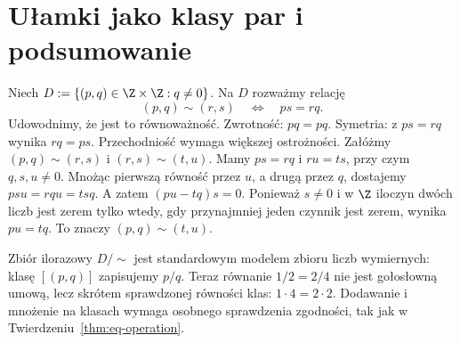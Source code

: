\section{Ułamki jako klasy par i podsumowanie}\label{sec:eq-fractions}
\begin{przyklad}
Niech $D:=\{(p,q)\in\Z\times\Z:q\ne0\}$. Na $D$
rozważmy relację
\[
 (p,q)\sim(r,s)\quad\Longleftrightarrow\quad ps=rq.
\]
Udowodnimy, że jest to równoważność.
Zwrotność: $pq=pq$. Symetria: z $ps=rq$ wynika
$rq=ps$. Przechodniość wymaga większej ostrożności.
Załóżmy $(p,q)\sim(r,s)$ i $(r,s)\sim(t,u)$.
Mamy $ps=rq$ i $ru=ts$, przy czym $q,s,u\ne0$.
Mnożąc pierwszą równość przez $u$, a drugą przez $q$,
dostajemy $psu=rqu=tsq$. A zatem $(pu-tq)s=0$.
Ponieważ $s\ne0$ i w $\Z$ iloczyn dwóch liczb jest
zerem tylko wtedy, gdy przynajmniej jeden czynnik jest zerem,
wynika $pu=tq$. To znaczy $(p,q)\sim(t,u)$.

Zbiór ilorazowy $D/{\sim}$ jest standardowym modelem
zbioru liczb wymiernych: klasę $[(p,q)]$ zapisujemy $p/q$.
Teraz równanie $1/2=2/4$ nie jest gołosłowną umową,
lecz skrótem sprawdzonej równości klas:
$1\cdot4=2\cdot2$. Dodawanie i mnożenie na klasach
wymaga osobnego sprawdzenia zgodności, tak jak w
Twierdzeniu~\ref{thm:eq-operation}.
\end{przyklad}


